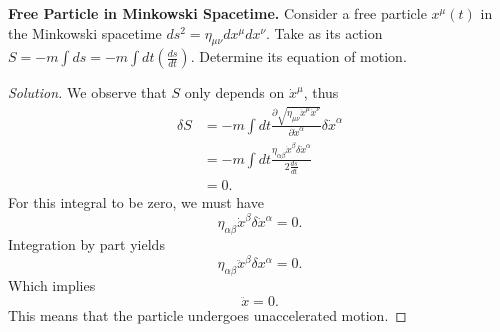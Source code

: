 
\textbf{Free Particle in Minkowski Spacetime.} Consider a free particle $x^\mu(t)$ in the Minkowski spacetime $ds^2 = \eta_{\mu \nu} dx^\mu dx^\nu$. Take as its action $S = - m \int ds = - m \int dt \left( \frac{ds}{dt} \right) $. Determine its equation of motion.

\begin{proof}[Solution]
	We observe that $S$ only depends on $\dot{x}^\mu$, thus
	\begin{align*}
		\delta S
		&= - m \int dt \frac{\partial \sqrt{\eta_{\mu \nu}\dot{x}^\mu \dot{x} ^\nu} }{\partial \dot{x}^\alpha} \delta \dot{x}^\alpha \\
		&= - m \int dt \frac{\eta_{\alpha \beta}\dot{x}^\beta \delta\dot{x} ^\alpha} {2 \frac{ds}{dt}} \\
		&= 0
	.\end{align*}
	For this integral to be zero, we must have
	\[
		\eta_{\alpha \beta} \dot{x}^\beta \delta\dot{x} ^\alpha = 0
	.\] 
	Integration by part yields
	\[
		\eta_{\alpha \beta} \ddot{x} ^\beta \delta x^\alpha = 0
	.\] 
	Which implies
	\[
		\ddot x = 0
	.\] 
	This means that the particle undergoes unaccelerated motion.
\end{proof}


